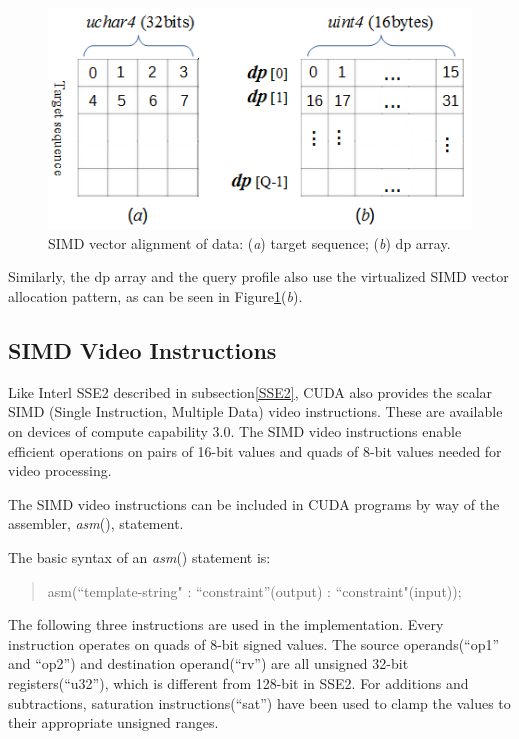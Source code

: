 \begin{figure}[!htb]
	\centering
	\includegraphics[totalheight=0.2\textheight]{Figures/simdvector.png}
	\caption{\selectfont SIMD vector alignment of data: (\textit{a}) target sequence; (\textit{b}) dp array.}
	\label{fig:simdvector}
\end{figure}

Similarly, the dp array and the query profile also use the virtualized SIMD vector allocation pattern, as can be seen in Figure\ref{fig:simdvector}(\textit{b}).

\subsection{SIMD Video Instructions}
\label{video}

Like Interl SSE2 described in subsection\ref{SSE2}, CUDA also provides the scalar SIMD (Single Instruction, Multiple Data) video instructions. These are available on devices of compute capability 3.0. The SIMD video instructions enable efficient operations on pairs of 16-bit values and quads of 8-bit values needed for video processing.

The SIMD video instructions can be included in CUDA programs by way of the assembler, \emph{asm}(), statement.

The basic syntax of an \emph{asm}() statement is:

\begin{quote}
\selectfont
 asm(``template-string" : ``constraint''(output) : ``constraint"(input));
\end{quote}

The following three instructions are used in the implementation. Every instruction operates on quads of 8-bit signed values. The source operands(“op1” and “op2”) and destination operand(“rv”) are all unsigned 32-bit registers(“u32”), which is different from 128-bit in SSE2. For additions and subtractions, saturation instructions(“sat”) have been used to clamp the values to their appropriate unsigned ranges.

